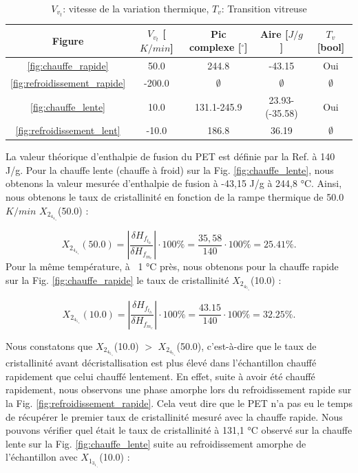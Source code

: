 \begin{table}[!ht]
\centering
\footnotesize
\setlength{\tabcolsep}{4pt}
\renewcommand{\arraystretch}{0.9}
\begin{tabular}{|c|c|c|c|c|}
\hline
        \textbf{Figure}
        & \textbf{$V_v_t$ [$K/min$]}
        & \textbf{Pic complexe [$^\circ$]}
        & \textbf{Aire [$J/g$]}
        & \textbf{$T_v$ [bool]}
\\\hline
        \ref{fig:chauffe_rapide} & 50.0 & 244.8 & -43.15 & Oui  \\
        \ref{fig:refroidissement_rapide} & -200.0 & $\emptyset$ & $\emptyset$ & $\emptyset$  \\
        \ref{fig:chauffe_lente} & 10.0 & 131.1-245.9 & 23.93-(-35.58) & Oui \\
        \ref{fig:refroidissement_lent} & -10.0 & 186.8 & 36.19 & $\emptyset$ \\
\hline
\end{tabular}
        \caption{$V_v_t$: vitesse de la variation thermique, $T_v$: Transition vitreuse}
\label{val:peaks}
\end{table}
La valeur théorique d’enthalpie de fusion du PET est définie par la Ref. \cite{petnet} à 140 J/g. Pour la chauffe lente (chauffe à froid) sur la Fig. \ref{fig:chauffe_lente}, nous obtenons la valeur mesurée d’enthalpie de fusion à -43,15 J/g à 244,8 °C. Ainsi, nous obtenons le taux de cristallinité en fonction de la rampe thermique de 50.0 $K/min$ $X_2_4_4_._8$(50.0) :


\[
	X_2_4_4_._8(50.0) = |\frac{\delta H_f_t_h}{\delta H_f_m_e}| \cdot 100\% = \frac{35,58}{140} \cdot 100 \% = 25.41 \%.
\]
Pour la même température, à ~1 °C près, nous obtenons pour la chauffe rapide sur la Fig. \ref{fig:chauffe_rapide} le taux de cristallinité $X_2_4_5_._9$(10.0) :

\[
	X_2_4_5_._9(10.0) = |\frac{\delta H_f_t_h}{\delta H_f_m_e}| \cdot 100\% = \frac{43.15}{140} \cdot 100\% = 32.25 \%.
\]

Nous constatons que $X_2_4_5_._9$(10.0) $>$ $X_2_4_5_._9$(50.0), c’est-à-dire que le taux de cristallinité avant décristallisation est plus élevé dans l’échantillon chauffé rapidement que celui chauffé lentement. En effet, suite à avoir été chauffé rapidement, nous observons une phase amorphe lors du refroidissement rapide sur la Fig. \ref{fig:refroidissement_rapide}. Cela veut dire que le PET n’a pas eu le temps de récupérer le premier taux de cristallinité mesuré avec la chauffe rapide. Nous pouvons vérifier quel était le taux de cristallinité à 131,1 °C observé sur la chauffe lente sur la Fig. \ref{fig:chauffe_lente} suite au refroidissement amorphe de l’échantillon avec $X_1_3_1_._1$(10.0) :

